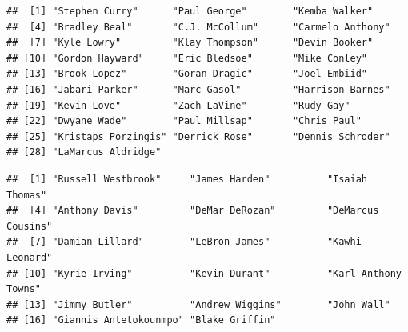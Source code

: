 \documentclass[
]{book}
\newenvironment{Shaded}{\begin{snugshade}}{\end{snugshade}}
\newcommand{\DecValTok}[1]{\textcolor[rgb]{0.00,0.00,0.81}{#1}}
\newcommand{\FunctionTok}[1]{\textcolor[rgb]{0.00,0.00,0.00}{#1}}
\newcommand{\NormalTok}[1]{#1}
\newcommand{\SpecialCharTok}[1]{\textcolor[rgb]{0.00,0.00,0.00}{#1}}
\theoremstyle{definition}
\theoremstyle{definition}
\theoremstyle{definition}
\theoremstyle{definition}
\theoremstyle{remark}
\begin{document}
\begin{verbatim}
##  [1] "Stephen Curry"      "Paul George"        "Kemba Walker"      
##  [4] "Bradley Beal"       "C.J. McCollum"      "Carmelo Anthony"   
##  [7] "Kyle Lowry"         "Klay Thompson"      "Devin Booker"      
## [10] "Gordon Hayward"     "Eric Bledsoe"       "Mike Conley"       
## [13] "Brook Lopez"        "Goran Dragic"       "Joel Embiid"       
## [16] "Jabari Parker"      "Marc Gasol"         "Harrison Barnes"   
## [19] "Kevin Love"         "Zach LaVine"        "Rudy Gay"          
## [22] "Dwyane Wade"        "Paul Millsap"       "Chris Paul"        
## [25] "Kristaps Porzingis" "Derrick Rose"       "Dennis Schroder"   
## [28] "LaMarcus Aldridge"
\end{verbatim}

\begin{Shaded}
\end{Shaded}

\begin{verbatim}
##  [1] "Russell Westbrook"     "James Harden"          "Isaiah Thomas"        
##  [4] "Anthony Davis"         "DeMar DeRozan"         "DeMarcus Cousins"     
##  [7] "Damian Lillard"        "LeBron James"          "Kawhi Leonard"        
## [10] "Kyrie Irving"          "Kevin Durant"          "Karl-Anthony Towns"   
## [13] "Jimmy Butler"          "Andrew Wiggins"        "John Wall"            
## [16] "Giannis Antetokounmpo" "Blake Griffin"
\end{verbatim}

\begin{Shaded}
\end{Shaded}
\end{document}
